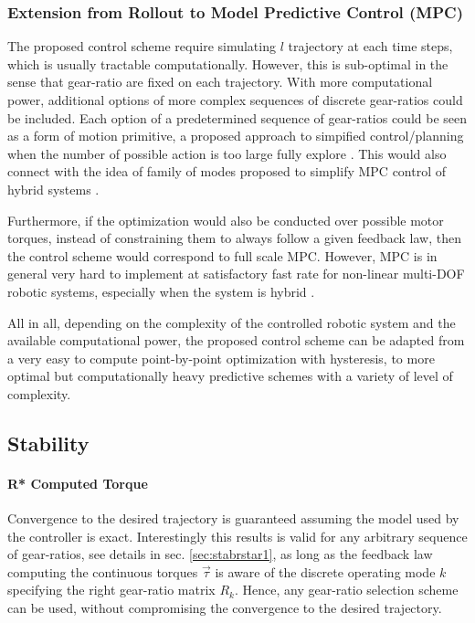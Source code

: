 \subsubsection{Extension from Rollout to Model Predictive Control (MPC)}

The proposed control scheme require simulating $l$ trajectory at each time steps, which is usually tractable computationally. However, this is sub-optimal in the sense that gear-ratio are fixed on each trajectory. With more computational power, additional options of more complex sequences of discrete gear-ratios could be included. Each option of a predetermined sequence of gear-ratios could be seen as a form of motion primitive, a proposed approach to simpified control/planning when the number of possible action is too large fully explore \cite{gray_predictive_2012}. This would also connect with the idea of family of modes proposed to simplify MPC control of hybrid systems \cite{_feedback_????}. 

Furthermore, if the optimization would also be conducted over possible motor torques, instead of constraining them to always follow a given feedback law, then the control scheme would correspond to full scale MPC. However, MPC is in general very hard to implement at satisfactory fast rate for non-linear multi-DOF robotic systems, especially when the system is hybrid \cite{_feedback_????}.

All in all, depending on the complexity of the controlled robotic system and the available computational power, the proposed control scheme can be adapted from a very easy to compute point-by-point optimization with hysteresis, to more optimal but computationally heavy predictive schemes with a variety of level of complexity. 



\subsection{Stability}

\paragraph{R* Computed Torque} Convergence to the desired trajectory is guaranteed assuming the model used by the controller is exact. Interestingly this results is valid for any arbitrary sequence of gear-ratios, see details in sec. \ref{sec:stabrstar1}, as long as the feedback law computing the continuous torques $\vec{\tau}$ is aware of the discrete operating mode $k$ specifying the right gear-ratio matrix $R_k$. Hence, any gear-ratio selection scheme can be used, without compromising the convergence to the desired trajectory. 

